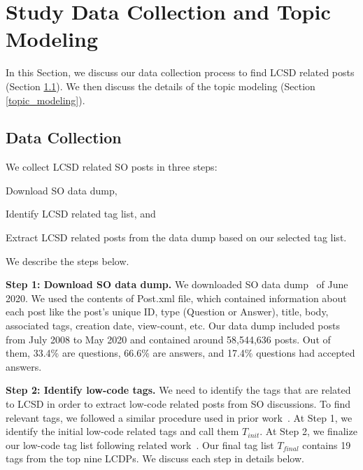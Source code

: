 \section{Study Data Collection and Topic Modeling} \label{sec:methodology}
In this Section, we discuss our data collection process to find  LCSD related posts (Section \ref{data_collection}). We then discuss the details of the topic modeling (Section \ref{topic_modeling}).
 
\subsection{Data Collection} \label{data_collection}
We collect  LCSD related SO posts in three steps: \begin{inparaenum}[(1)]
\item Download SO data dump,
\item Identify  LCSD related tag list, and
\item Extract  LCSD related posts from the data dump based on our selected tag list.
\end{inparaenum} We describe the steps below.

\nd\textbf{Step 1: Download SO data dump.} We downloaded SO data dump~\cite{SOdump} of June 2020. We used the contents of Post.xml file, which contained information about each post like the post's unique ID, type (Question or Answer), title, body, associated tags, creation date, view-count, etc. Our data dump included posts from July 2008 to May 2020 and contained around 58,544,636 posts. Out of them, 33.4\% are questions, 66.6\% are answers, and 17.4\% questions had accepted answers.

\nd\textbf{Step 2: Identify low-code tags.}
We need to identify the tags that are related to LCSD in order to extract low-code related posts from SO discussions.
To find relevant tags, we followed a similar procedure used in prior work~\cite{abdellatif2020challenges, ahmed2018concurrency, wan2019discussed, linares2013exploratory}. At Step 1, we identify the initial low-code related tags and call them $T_{init}$. At Step 2, we finalize our low-code tag list following related work~\cite{bagherzadeh2019going, yang2016security}. Our final tag list $T_{final}$ contains 19 tags from the top nine LCDPs. We discuss each step in details below.


